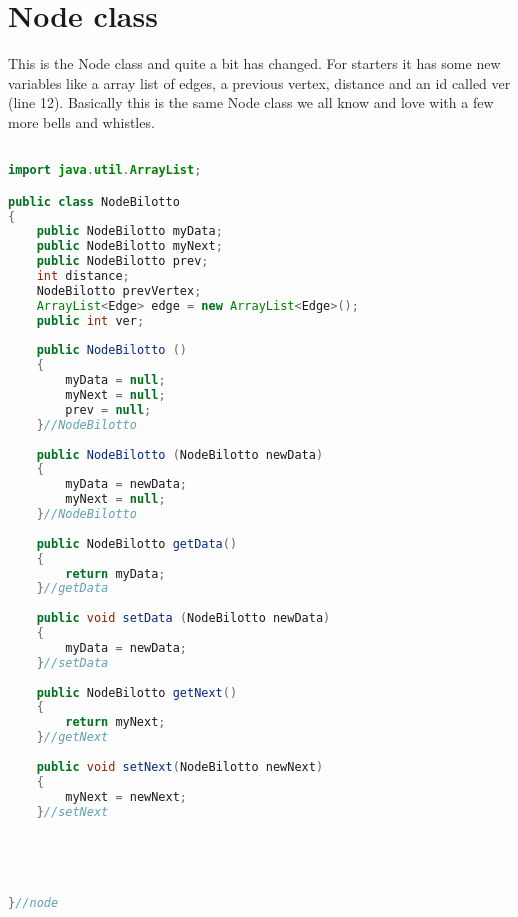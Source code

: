 \documentclass[letterpaper, 10pt]{article}
\begin{document}
\section{Node class}
This is the Node class and quite a bit has changed. For starters it has some new variables like a array list of edges, a previous vertex, distance and an id called ver (line 12). Basically this is the same Node class we all know and love with a few more bells and whistles.
\begin{lstlisting}[language = java]

import java.util.ArrayList;

public class NodeBilotto 
{
	public NodeBilotto myData;
	public NodeBilotto myNext;
	public NodeBilotto prev;
	int distance;
	NodeBilotto prevVertex;
	ArrayList<Edge> edge = new ArrayList<Edge>();
	public int ver;
	
	public NodeBilotto ()
	{
		myData = null;
		myNext = null;
		prev = null;
	}//NodeBilotto
	
	public NodeBilotto (NodeBilotto newData)
	{
		myData = newData;
		myNext = null;
	}//NodeBilotto
	
	public NodeBilotto getData()
	{
		return myData;
	}//getData
	
	public void setData (NodeBilotto newData)
	{
		myData = newData;
	}//setData
	
	public NodeBilotto getNext()
	{
		return myNext;
	}//getNext
	
	public void setNext(NodeBilotto newNext)
	{
		myNext = newNext;
	}//setNext
	
	
	

	
}//node


\end{lstlisting}
\end{document}
